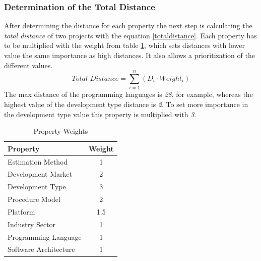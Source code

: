 \subsubsection{\textbf{Determination of the Total Distance}}
After determining the distance for each property the next step is calculating the \textit{total distance} of two projects with the equation \ref{totaldistance}. Each property has to be multiplied with the weight from table \ref{propertyweights}, which sets distances with lower value the same importance as high distances. It also allows a prioritization of the different values. 
\begin{equation}
\textit{Total Distance} = \sum \limits_{i=1}^n ( D_i \cdot Weight_i )\label{totaldistance}
\end{equation}
The max distance of the programming languages is \textit{28}, for example, whereas the highest value of the development type distance is \textit{2}. To set more importance in the development type value this property is multiplied with \textit{3}.
\begin{table}[h]
	\centering 
	\setlength{\tabcolsep}{4pt}
	\begin{tabular}{|l|c|}\hline
		Property	& Weight 	\\ \hline
		Estimation Method   	& 1      	\\ \hline
		Development Market   	& 2      	\\ \hline
		Development Type   		& 3      	\\ \hline
		Procedure Model   		& 2      	\\ \hline
		Platform   				& 1.5      	\\ \hline
		Industry Sector   		& 1      	\\ \hline
		Programming Language   	& 1      	\\ \hline
		Software Architecture   & 1      	\\ \hline
	\end{tabular} 
	\caption{Property Weights} 
	\label{propertyweights} 
\end{table}
